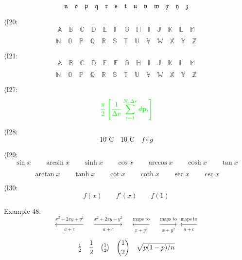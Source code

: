 \documentclass{book}
\begin{document}
\[\mathbf{\mathfrak{n}}\quad\mathbf{\mathfrak{o}}\quad \mathbf{\mathfrak{p}}\quad \mathbf{\mathfrak{q}}\quad \mathbf{\mathfrak{r}}\quad 
\mathbf{\mathfrak{s}}\quad \mathbf{\mathfrak{t}}\quad \mathbf{\mathfrak{u}}\quad \mathbf{\mathfrak{v}}\quad 
\mathbf{\mathfrak{w}}\quad \mathbf{\mathfrak{x}}\quad \mathbf{\mathfrak{y}}\quad \mathbf{\mathfrak{z}}\]

$\langle$I20:
\[\mathbb{A}\quad \mathbb{B}\quad \mathbb{C}\quad \mathbb{D}\quad
\mathbb{E}\quad \mathbb{F}\quad \mathbb{G}\quad \mathbb{H}\quad 
\mathbb{I}\quad \mathbb{J}\quad \mathbb{K}\quad \mathbb{L}\quad 
\mathbb{M}\] 

\[\mathbb{N}\quad \mathbb{O}\quad \mathbb{P}\quad 
\mathbb{Q}\quad \mathbb{R}\quad \mathbb{S}\quad \mathbb{T}\quad 
\mathbb{U}\quad \mathbb{V}\quad \mathbb{W}\quad \mathbb{X}\quad 
\mathbb{Y}\quad \mathbb{Z}\]

$\langle$I21:
\[\mathbf{\mathbb{A}}\quad \mathbf{\mathbb{B}}\quad \mathbf{\mathbb{C}}\quad \mathbf{\mathit{\mathbb{D}}}\quad
\mathbf{\mathbb{E}}\quad \mathbf{\mathbb{F}}\quad \mathbf{\mathbb{G}}\quad \mathbf{\mathbb{H}}\quad 
\mathbf{\mathbb{I}}\quad \mathbf{\mathbb{J}}\quad \mathbf{\mathbb{K}}\quad \mathbf{\mathbb{L}}\quad 
\mathbf{\mathbb{M}}\]

\[\mathbf{\mathbb{N}}\quad \mathbf{\mathbb{O}}\quad \mathbf{\mathbb{P}}\quad 
\mathbf{\mathbb{Q}}\quad \mathbf{\mathbb{R}}\quad \mathbf{\mathbb{S}}\quad \mathbf{\mathbb{T}}\quad 
\mathbf{\mathbb{U}}\quad \mathbf{\mathbb{V}}\quad \mathbf{\mathbb{W}}\quad \mathbf{\mathbb{X}}\quad 
\mathbf{\mathbb{Y}}\quad \mathbf{\mathbb{Z}}\]

$\langle$I27:
\[\color{green}{\frac{\pi}{2} \left[\frac{1}{\Delta v}\sum_{i=1}^{N_{e}\Delta v}d\mathbf{p}_{i}\right]}\]

$\langle$I28:
\[{10}^{\circ}\text{C}\quad {10}_{\circ}\text{C}\quad f\circ g\]

$\langle$I29:
\[\sin x\qquad \arcsin x\qquad \sinh x\qquad \cos x\qquad \arccos x\qquad
\cosh x\qquad \tan x\]

\[\arctan x\qquad \tanh x\qquad \cot x\qquad \coth x\qquad \sec x\qquad \csc x\]

$\langle$I30:
\[f(x)\qquad f'(x) \qquad f(1)\]

\noindent Example 48:
\[
\xleftarrow[a+c]{x^2+2xy+y^2} \quad
\xrightarrow[a+c]{x^2+2xy+y^2}\quad
\xleftarrow[x+y^2]{\text{maps to}} \quad 
\xrightarrow[x+y^2]{\text{maps to}} 
\xleftarrow[a+c]{\text{maps to}}
\]


\[
\hbox{$\frac12$} \quad \frac12\quad \hbox{${1\choose2}$}\quad {1\choose2} \quad \sqrt{p(1-p)/n}
\]
\end{document}
